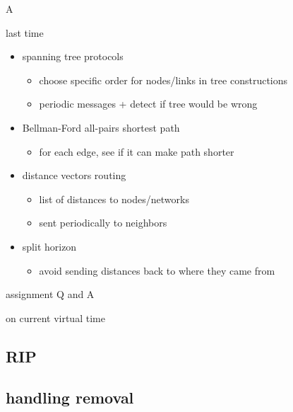 \date{}
\title{}
\date{}

\begin{frame}
    \titlepage
\end{frame}A

\begin{frame}{last time}
    \begin{itemize}
    \item spanning tree protocols
        \begin{itemize}
        \item choose specific order for nodes/links in tree constructions
        \item periodic messages + detect if tree would be wrong
        \end{itemize}
    \item Bellman-Ford all-pairs shortest path
        \begin{itemize}
        \item for each edge, see if it can make path shorter
        \end{itemize}
    \item distance vectors routing
        \begin{itemize}
        \item list of distances to nodes/networks
        \item sent periodically to neighbors
        \end{itemize}
    \item split horizon
        \begin{itemize}
        \item avoid sending distances back to where they came from
        \end{itemize}
    \end{itemize}
\end{frame}

\begin{frame}{assignment Q and A}
\end{frame}

\begin{frame}{on current virtual time}
\end{frame}

\subsection{RIP}



\subsection{handling removal}

